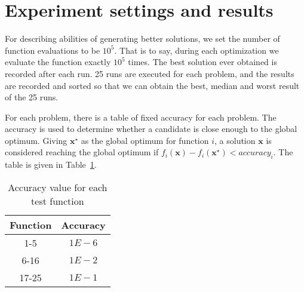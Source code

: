 \section{Experiment settings and results}
\label{sec:experiment}

For describing abilities of generating better solutions, we set the number of
function evaluations to be $10^5$. 
That is to say, during each optimization we evaluate the function
exactly $10^5$ times. 
The best solution ever obtained is recorded after each run.
25 runs are executed for each problem, and the results are recorded and
sorted so that we can obtain the best, median and worst result of the 25
runs. 

For each problem, there is a table of fixed accuracy for each problem.
The accuracy is used to determine whether a candidate is close enough to
the global optimum.
Giving $\mathbf{x^\star}$ as the global optimum for function $i$, a solution
$\mathbf{x}$ is considered reaching the global optimum if $f_i(\mathbf{x}) -
f_i(\mathbf{x^\star}) < accuracy_i$. 
The table is given in Table~\ref{table:accuracy}.

\begin{table}
\centering
\begin{tabular}{c|c}
Function & Accuracy \\\hline
1-5      &  $1E-6$  \\\hline
6-16     &  $1E-2$  \\\hline
17-25    &  $1E-1$  \\
\end{tabular}
\caption{Accuracy value for each test function}
\label{table:accuracy}
\end{table}

